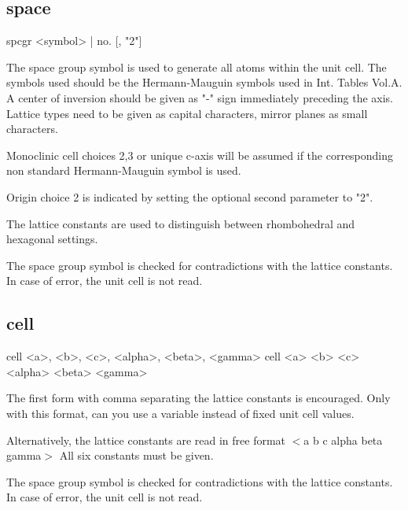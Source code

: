\subsection*{space}
\begin{MacVerbatim}
spcgr {<symbol> | no. } [, "2"]
\end{MacVerbatim}
The space group symbol is used to generate all atoms within the unit 
cell. The symbols used should be the Hermann-Mauguin symbols used in 
Int. Tables Vol.A. A center of inversion should be given as "-" sign 
immediately preceding the axis. Lattice types need to be given as 
capital characters, mirror planes as small characters. 
\par
Monoclinic cell choices 2,3 or unique c-axis will be assumed if the 
corresponding non standard Hermann-Mauguin symbol is used. 
\par
Origin choice 2 is indicated by setting the optional second parameter 
to "2". 
\par
The lattice constants are used to distinguish between rhombohedral 
and hexagonal settings. 
\par
The space group symbol is checked for contradictions with the lattice 
constants. In case of error, the unit cell is not read. 
\subsection*{cell}
\begin{MacVerbatim}
cell  <a>,  <b>,  <c>, <alpha>,  <beta>,  <gamma>
cell  <a>   <b>   <c>  <alpha>   <beta>   <gamma>
\end{MacVerbatim}
The first form with comma separating the lattice constants is 
encouraged. Only with this format, can you use a variable instead 
of fixed unit cell values. 
\par
Alternatively, the lattice constants are read in free format 
$ <$a b c alpha beta gamma$> $ 
All six constants must be given. 
\par
The space group symbol is checked for contradictions with the lattice 
constants. In case of error, the unit cell is not read. 
